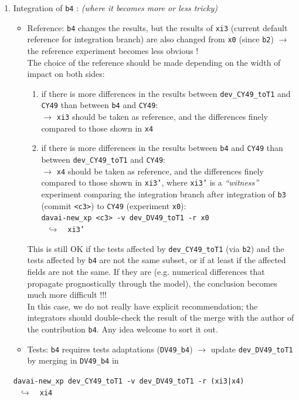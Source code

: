 \documentclass[a4paper,10pt,twoside]{article}
\begin{document}
\begin{appendix}
\begin{enumerate}[label=(\arabic*)]
 \item Integration of \texttt{b4} : \textit{(where it becomes more or less tricky)}
 \begin{itemize}
  \item Reference: \texttt{b4} changes the results, but the results of \texttt{xi3} (current default reference for integration branch) are also changed from \texttt{x0} (since \texttt{b2}) $\rightarrow$ the reference experiment becomes less obvious !\\
  The choice of the reference should be made depending on the width of impact on both sides:
  \begin{enumerate}[label=\alph*)]
   \item if there is more differences in the results between \texttt{dev\_CY49\_toT1} and \texttt{CY49} than between \texttt{b4} and \texttt{CY49}:\\
   $\rightarrow$ \texttt{xi3} should be taken as reference, and the differences finely compared to those shown in \texttt{x4}
   \item if there is more differences in the results between \texttt{b4} and \texttt{CY49} than between \texttt{dev\_CY49\_toT1} and \texttt{CY49}:\\
   $\rightarrow$ \texttt{x4} should be taken as reference, and the differences finely compared to those shown in \texttt{xi3'}, where \texttt{xi3'} is a \textit{``witness''} experiment comparing the integration branch after integration of \texttt{b3} (commit \texttt{<c3>}) to \texttt{CY49} (experiment \texttt{x0}):\\
   \texttt{davai-new\_xp <c3> -v dev\_DV49\_toT1 -r x0}\\
   $~~~\hookrightarrow~~~$ \texttt{xi3'}
  \end{enumerate}
  This is still OK if the tests affected by \texttt{dev\_CY49\_toT1} (via \texttt{b2}) and the tests affected by \texttt{b4} are not the same subset, or if at least if the affected fields are not the same. If they are (e.g. numerical differences that propagate prognostically through the model), the conclusion becomes much more difficult !!!\\
  In this case, we do not really have explicit recommendation; the integrators should double-check the result of the merge with the author of the contribution \texttt{b4}. Any idea welcome to sort it out.
  \item Tests: \texttt{b4} requires tests adaptations (\texttt{DV49\_b4}) $\rightarrow$ update \texttt{dev\_DV49\_toT1} by merging in \texttt{DV49\_b4} in
 \end{itemize}
 \texttt{davai-new\_xp dev\_CY49\_toT1 -v dev\_DV49\_toT1 -r (xi3|x4)}\\
   $~~~\hookrightarrow~~~$ \texttt{xi4}
\end{enumerate}


\end{appendix}
\end{document}
